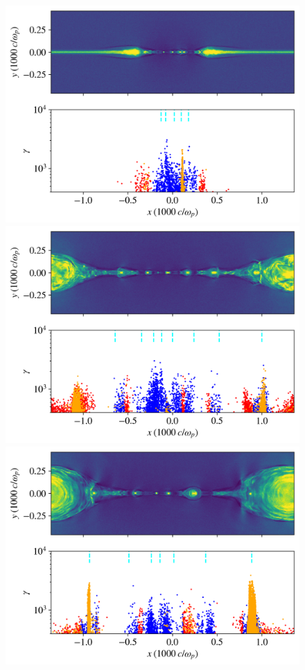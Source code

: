 \documentclass[iop,twocolappendix]{emulateapj}
\begin{document}
\begin{figure}[htp]
	{
		\includegraphics[width=\linewidth]{triggered_bguide0_snapshot8.png}
	}
	\newline
	{
		\includegraphics[width=\linewidth]{triggered_bguide0_snapshot18.png}
	}
	\newline
	{
		\includegraphics[width=\linewidth]{triggered_bguide0_snapshot25.png}
	}
	

\end{figure}
\end{document}
